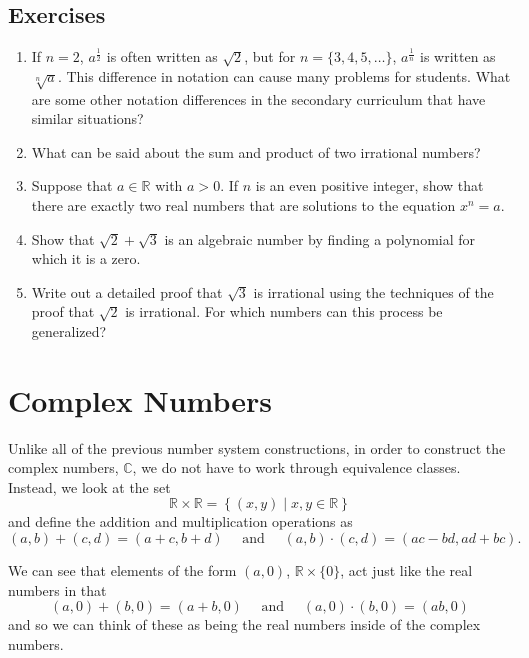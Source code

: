 \documentclass[
]{book}
\theoremstyle{definition}
\theoremstyle{definition}
\theoremstyle{definition}
\theoremstyle{definition}
\theoremstyle{remark}
\begin{document}
\hypertarget{exercises-14}{%
\subsection{Exercises}\label{exercises-14}}

\begin{enumerate}
\def\labelenumi{\arabic{enumi}.}
\item
  If \(n=2\), \(a^\frac{1}{2}\) is often written as \(\sqrt{2}\), but for \(n=\{3,4,5, \ldots\}\), \(a^{\frac{1}{n}}\) is written as \(\sqrt[n]{a}\). This difference in notation can cause many problems for students. What are some other notation differences in the secondary curriculum that have similar situations?
\item
  What can be said about the sum and product of two irrational numbers?
\item
  Suppose that \(a\in \mathbb{R}\) with \(a>0\). If \(n\) is an even positive integer, show that there are exactly two real numbers that are solutions to the equation \(x^n=a\).
\item
  Show that \(\sqrt{2}+\sqrt{3}\) is an algebraic number by finding a polynomial for which it is a zero.
\item
  Write out a detailed proof that \(\sqrt{3}\) is irrational using the techniques of the proof that \(\sqrt{2}\) is irrational. For which numbers can this process be generalized?
\end{enumerate}

\hypertarget{sec:complex}{%
\section{Complex Numbers}\label{sec:complex}}

Unlike all of the previous number system constructions, in order to construct the complex numbers, \(\mathbb{C}\), we do not have to work through equivalence classes. Instead, we look at the set
\[\mathbb{R} \times \mathbb{R} = \left\{ (x,y) \middle \vert x,y \in \mathbb{R}\right\}\] and define the addition and multiplication operations as
\[(a,b) + (c,d) = (a+c, b+d) \quad \mbox{ and } \quad (a,b) \cdot (c,d) = (ac-bd, ad+bc).\]

We can see that elements of the form \((a,0)\), \(\mathbb{R}\times \{0\}\), act just like the real numbers in that \[(a,0)+(b,0)=(a+b,0) \quad \mbox{ and } \quad (a,0)\cdot (b,0) = (ab,0)\] and so we can think of these as being the real numbers inside of the complex numbers.
\end{document}
